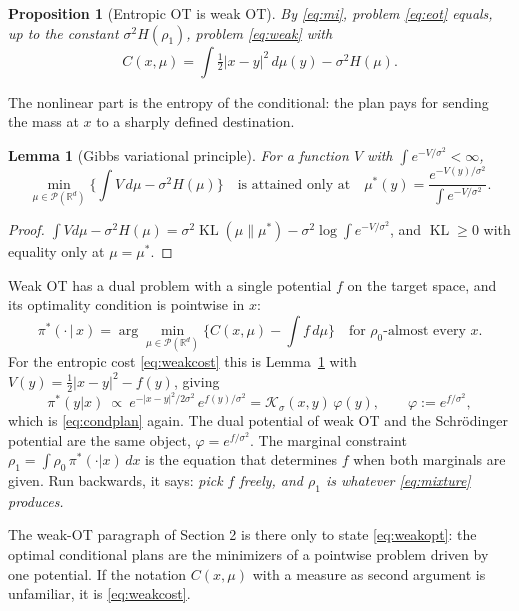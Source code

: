 \documentclass[11pt]{article}
\newcommand{\R}{\mathbb{R}}
\newcommand{\KL}{\operatorname{KL}}
\newcommand{\Pc}{\mathcal{P}}
\newcommand{\Kc}{\mathcal{K}}
\theoremstyle{definition}
\theoremstyle{plain}
\newtheorem{lemma}[definition]{Lemma}
\newtheorem{proposition}[definition]{Proposition}
\begin{document}
\begin{proposition}[Entropic OT is weak OT]
By \eqref{eq:mi}, problem \eqref{eq:eot} equals, up to the constant $\sigma^2H(\rho_1)$,
problem \eqref{eq:weak} with
\begin{equation}
  \label{eq:weakcost}
  C(x,\mu)=\int\tfrac12|x-y|^2\,d\mu(y)-\sigma^2H(\mu).
\end{equation}
\end{proposition}
The nonlinear part is the entropy of the conditional: the plan pays for sending the mass at
$x$ to a sharply defined destination.

\begin{lemma}[Gibbs variational principle]
\label{lem:gibbs}
For a function $V$ with $\int e^{-V/\sigma^2}<\infty$,
\[
  \min_{\mu\in\Pc(\R^d)}\Big\{\int V\,d\mu-\sigma^2H(\mu)\Big\}
  \quad\text{is attained only at}\quad
  \mu^*(y)=\frac{e^{-V(y)/\sigma^2}}{\int e^{-V/\sigma^2}} .
\]
\end{lemma}
\begin{proof}
$\int V d\mu-\sigma^2H(\mu)=\sigma^2\KL(\mu\|\mu^*)-\sigma^2\log\int e^{-V/\sigma^2}$, and
$\KL\ge0$ with equality only at $\mu=\mu^*$.
\end{proof}

Weak OT has a dual problem with a single potential $f$ on the target space, and its
optimality condition is pointwise in $x$:
\begin{equation}
  \label{eq:weakopt}
  \pi^*(\cdot\,|\,x)=\arg\min_{\mu\in\Pc(\R^d)}\Big\{C(x,\mu)-\int f\,d\mu\Big\}
  \quad\text{for }\rho_0\text{-almost every }x .
\end{equation}
For the entropic cost \eqref{eq:weakcost} this is Lemma~\ref{lem:gibbs} with
$V(y)=\tfrac12|x-y|^2-f(y)$, giving
\[
  \pi^*(y|x)\ \propto\ e^{-|x-y|^2/2\sigma^2}\,e^{f(y)/\sigma^2}=\Kc_\sigma(x,y)\,\varphi(y),\qquad \varphi:=e^{f/\sigma^2},
\]
which is \eqref{eq:condplan} again. The dual potential of weak OT and the Schr\"odinger
potential are the same object, $\varphi=e^{f/\sigma^2}$. The marginal constraint
$\rho_1=\int\rho_0\,\pi^*(\cdot|x)\,dx$ is the equation that determines $f$ when both
marginals are given. Run backwards, it says: \emph{pick $f$ freely, and $\rho_1$ is whatever
\eqref{eq:mixture} produces.}

\begin{readbox}
The weak-OT paragraph of Section 2 is there only to state \eqref{eq:weakopt}: the optimal
conditional plans are the minimizers of a pointwise problem driven by one potential. If the
notation $C(x,\mu)$ with a measure as second argument is unfamiliar, it is \eqref{eq:weakcost}.
\end{readbox}
\end{document}
